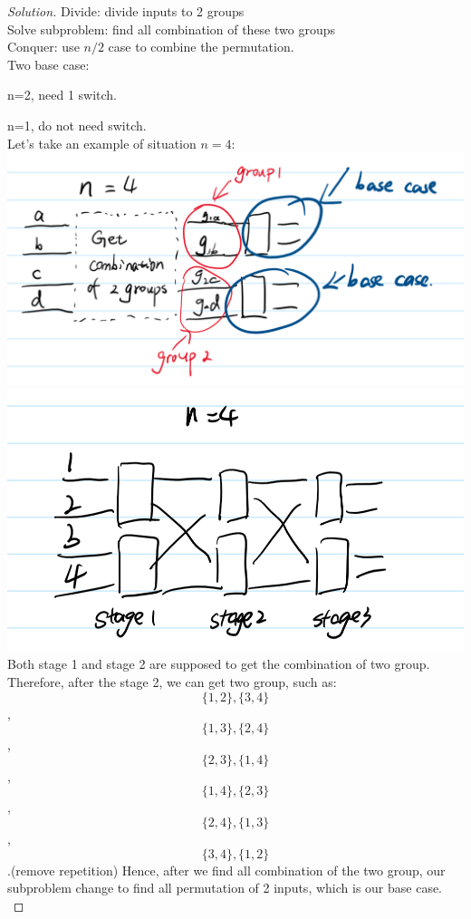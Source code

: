\documentclass[12pt]{article}
\begin{document}
\begin{proof}[Solution]
	Divide: divide inputs to 2 groups\\
	Solve subproblem: find all combination of these two groups\\
	Conquer: use $n/2$ case to combine the permutation.\\
	Two base case:
	
	n=2, need 1 switch.
	
	n=1, do not need switch.\\
	Let's take an example of situation $n=4$:\\
	\includegraphics[scale=0.35]{82.png}\\
	\includegraphics[scale=0.35]{81.png}\\
	Both stage 1 and stage 2 are supposed to get the combination of two group. Therefore, after the stage 2, we can get two group, such as:\[\{1,2\},\{3,4\}\],\[\{1,3\},\{2,4\}\],\[\{2,3\},\{1,4\}\],\[\{1,4\},\{2,3\}\],\[\{2,4\},\{1,3\}\],\[\{3,4\},\{1,2\}\].(remove repetition) Hence, after we find all combination of the two group, our subproblem change to find all permutation of 2 inputs, which is our base case.\\

\end{proof}
\end{document}
